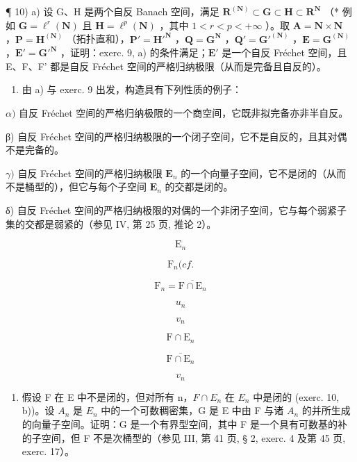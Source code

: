 ¶ 10) a) 设 G、H 是两个自反 Banach 空间，满足 \(\mathbf{R}^{(\mathbf{N})} \subset \mathbf{G} \subset \mathbf{H} \subset \mathbf{R}^{\mathbf{N}}\) （* 例如 \(\mathbf{G} = \ell^{r}(\mathbf{N})\) 且 \(\mathbf{H} = \ell^{p}(\mathbf{N})\) ，其中 \(1 < r < p < +\infty\) ）。取 \(\mathbf{A} = \mathbf{N} \times \mathbf{N}\) ，\(\mathbf{P} = \mathbf{H}^{(\mathbf{N})}\) （拓扑直和），\(\mathbf{P}' = \mathbf{H}'^{\mathbf{N}}\) ，\(\mathbf{Q} = \mathbf{G}^{\mathbf{N}}\) ，\(\mathbf{Q}' = \mathbf{G}'^{(\mathbf{N})}\) ，\(\mathbf{E} = \mathbf{G}^{(\mathbf{N})}\) ，\(\mathbf{E}' = \mathbf{G}'^{\mathbf{N}}\) ，证明：exerc. 9, a) 的条件满足；\(\mathbf{E}'\) 是一个自反 Fréchet 空间，且 E、F、F' 都是自反 Fréchet 空间的严格归纳极限（从而是完备且自反的）。

\begin{enumerate}
\def\labelenumi{\alph{enumi})}
\setcounter{enumi}{1}
\tightlist
\item
  由 a) 与 exerc. 9 出发，构造具有下列性质的例子：
\end{enumerate}

\(\alpha)\) 自反 Fréchet 空间的严格归纳极限的一个商空间，它既非拟完备亦非半自反。

β) 自反 Fréchet 空间的严格归纳极限的一个闭子空间，它不是自反的，且其对偶不是完备的。

\(\gamma)\) 自反 Fréchet 空间的严格归纳极限 \(\mathbf{E}_n\) 的一个向量子空间，它不是闭的（从而不是桶型的），但它与每个子空间 \(\mathbf{E}_n\) 的交都是闭的。

δ) 自反 Fréchet 空间的严格归纳极限的对偶的一个非闭子空间，它与每个弱紧子集的交都是弱紧的（参见 IV, 第 25 页, 推论 2）。

\[
\mathrm{E} _ {n}
\]

\[
\mathrm{F} _ {n} (c f.
\]

\[
\mathrm{F} _ {n} = \overline {{\mathrm{F} \cap \mathrm{E} _ {n}}}
\]

\[
u _ {n}
\]

\[
v _ {n}
\]

\[
\mathrm{F} \cap \mathrm{E} _ {n}
\]

\[
\overline {{\mathrm{F} \cap \mathrm{E} _ {n}}}
\]

\[
v _ {n}
\]

\begin{enumerate}
\def\labelenumi{\alph{enumi})}
\setcounter{enumi}{1}
\tightlist
\item
  假设 F 在 E 中不是闭的，但对所有 n，\(F \cap E_{n}\) 在 \(E_{n}\) 中是闭的 (exerc. 10, b))。设 \(A_{n}\) 是 \(E_{n}\) 中的一个可数稠密集，G 是 E 中由 F 与诸 \(A_{n}\) 的并所生成的向量子空间。证明：G 是一个有界型空间，其中 F 是一个具有可数基的补的子空间，但 F 不是次桶型的（参见 III, 第 41 页, § 2, exerc. 4 及第 45 页, exerc. 17）。
\end{enumerate}


